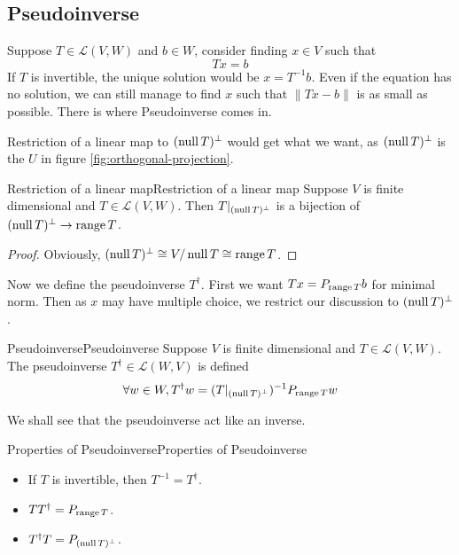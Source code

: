\documentclass[../main.tex]{subfiles}
\begin{document}
\subsection{Pseudoinverse}
Suppose $T\in \mathscr{L}(V,W)$ and $b\in W$, consider finding $x\in V$ such that
\begin{equation*}
Tx=b
\end{equation*}
If $T$ is invertible, the unique solution would be $x= T^{-1}b$. Even if the equation has no solution, we can still manage to find $x$ such that $\|Tx-b\|$ is as small as possible. There is where Pseudoinverse comes in.

Restriction of a linear map to $(\operatorname{null} T)^{\perp}$ would get what we want, as $(\operatorname{null} T)^{\perp}$ is the $U$ in figure \ref{fig:orthogonal-projection}.
\begin{proposition}{Restriction of a linear map}{Restriction of a linear map}
Suppose $V$ is finite dimensional and $T\in \mathscr{L}(V,W)$. Then $T|_{(\operatorname{null} T)^{\perp}}$ is a bijection of $(\operatorname{null} T)^{\perp} \rightarrow \operatorname{range} T$.
\end{proposition}
\begin{proof}
Obviously, $(\operatorname{null} T)^{\perp}\cong V / \operatorname{null} T\cong \operatorname{range} T$.
\end{proof}

Now we define the pseudoinverse $T^{\dagger}$. First we want $Tx = P_{\operatorname{range} T}b$ for minimal norm. Then as $x$ may have multiple choice, we restrict our discussion to $(\operatorname{null} T)^{\perp}$.

\begin{definition}{Pseudoinverse}{Pseudoinverse}
Suppose $V$ is finite dimensional and $T\in \mathscr{L}(V,W)$. The pseudoinverse $T ^\dagger\in \mathscr{L}(W,V)$ is defined
\begin{equation}
\forall w\in W,T ^\dagger w = (T|_{(\operatorname{null} T)^{\perp}})^{-1} P_{\operatorname{range} T}w
\end{equation}
\end{definition}
We shall see that the pseudoinverse act like an inverse.

\begin{proposition}{Properties of Pseudoinverse}{Properties of Pseudoinverse}
\begin{itemize}
\item If $T$ is invertible, then $T ^{-1}= T ^\dagger$.
\item $T T ^\dagger = P_{\operatorname{range} T}$.
\item $T ^\dagger T = P_{(\operatorname{null} T)^{\perp}}$.
\end{itemize}
\end{proposition}
\end{document}
